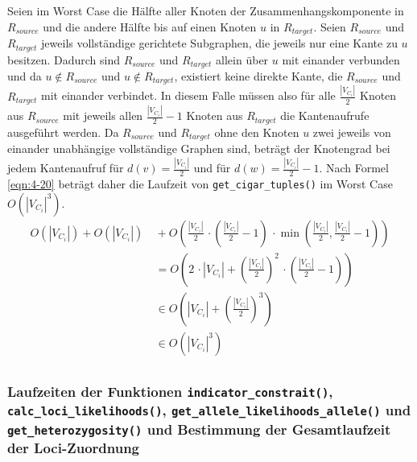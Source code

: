 Seien im Worst Case die Hälfte aller Knoten der Zusammenhangskomponente in $ R_{source} $ und die andere Hälfte bis auf einen Knoten $u$ in $ R_{target} $. Seien $ R_{source} $ und $ R_{target} $ jeweils vollständige gerichtete Subgraphen, die jeweils nur eine Kante zu $u$ besitzen. Dadurch sind $ R_{source} $ und $ R_{target} $ allein über $u$ mit einander verbunden und da $u \notin R_{source}$ und $u \notin R_{target}$, existiert keine direkte Kante, die $ R_{source} $ und $ R_{target} $ mit einander verbindet. In diesem Falle müssen also für alle $\frac{|V_{C_{i}}|}{2}$ Knoten aus $ R_{source} $ mit jeweils allen $\frac{|V_{C_{i}}|}{2}-1$ Knoten aus $R_{target}$ die Kantenaufrufe ausgeführt werden. Da $ R_{source} $ und $ R_{target} $ ohne den Knoten $u$ zwei jeweils von einander unabhängige vollständige Graphen sind, beträgt der Knotengrad bei jedem Kantenaufruf für $d(v) = \frac{|V_{C_{i}}|}{2}$ und für $d(w) = \frac{|V_{C_{i}}|}{2} -1$. Nach Formel \eqref{eqn:4-20} beträgt daher die Laufzeit von \lstinline|get_cigar_tuples()| im Worst Case $O(|V_{C_{i}}|^3)$. \\

\begin{equation} \label{eqn:4-20}
\tag{4-20}
\begin{aligned}
 O(|V_{C_{i}}|) + O(|V_{C_{i}}|) &\ {} + O\left( \frac{|V_{C_{i}}|}{2} \, \cdotp \left( \frac{|V_{C_{i}}|}{2} - 1\right) \, \cdotp \min \left(\frac{|V_{C_{i}}|}{2}, \frac{|V_{C_{i}}|}{2} -1 \right)   \right)   \\
& \ = O\left(2  \, \cdotp |V_{C_{i}}| +  \left( \frac{|V_{C_{i}}|}{2}\right)^2 \, \cdotp \left( \frac{|V_{C_{i}}|}{2} - 1\right) \right) \\
&\ \in O\left(|V_{C_{i}}| + \left( \frac{|V_{C_{i}}|}{2}\right)^3 \right)  \\
&\ \in O(|V_{C_{i}}|^3) \\
\end{aligned}
\end{equation}

\subsubsection{Laufzeiten der Funktionen \lstinline|indicator_constrait()|, \lstinline|calc_loci_likelihoods()|, \linebreak \lstinline|get_allele_likelihoods_allele()| und \lstinline|get_heterozygosity()| und Bestimmung der Gesamtlaufzeit der Loci-Zuordnung} \label{subsubsec:compl_loci_lh}

